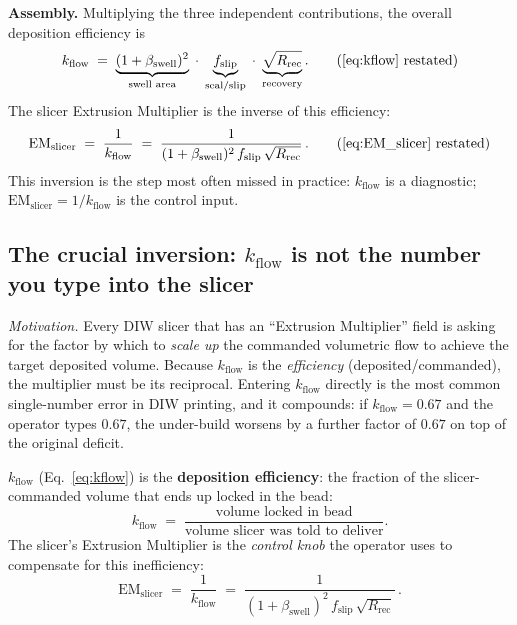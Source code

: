 \documentclass[11pt,a4paper]{article}
\begin{document}
\begin{derivationbox}[title={DERIVATION --- Each factor in $k_\mathrm{flow}=(1+\beta_\mathrm{swell})^2 f_\mathrm{slip}\sqrt{R_\mathrm{rec}}$}]
\medskip\noindent\textbf{Assembly.}
Multiplying the three independent contributions, the overall deposition
efficiency is
\begin{equation}
k_\mathrm{flow}
\;=\;
\underbrace{(1+\beta_\mathrm{swell})^{2}}_{\text{swell area}}
\;\cdot\;
\underbrace{f_\mathrm{slip}}_{\text{seal/slip}}
\;\cdot\;
\underbrace{\sqrt{R_\mathrm{rec}}}_{\text{recovery}}.
\tag{\ref{eq:kflow} restated}
\end{equation}
The slicer Extrusion Multiplier is the inverse of this efficiency:
\begin{equation}
\mathrm{EM}_\mathrm{slicer}
\;=\;
\frac{1}{k_\mathrm{flow}}
\;=\;
\frac{1}{(1+\beta_\mathrm{swell})^{2}\,f_\mathrm{slip}\,\sqrt{R_\mathrm{rec}}}\,.
\tag{\ref{eq:EM_slicer} restated}
\end{equation}
This inversion is the step most often missed in practice: $k_\mathrm{flow}$
is a diagnostic; $\mathrm{EM}_\mathrm{slicer}=1/k_\mathrm{flow}$ is
the control input.
\end{derivationbox}

\subsection{The crucial inversion: $k_\mathrm{flow}$ is not the number you type into the slicer}
\label{sec:kflow_inversion}

\emph{Motivation.}
Every DIW slicer that has an ``Extrusion Multiplier'' field is asking
for the factor by which to \emph{scale up} the commanded volumetric
flow to achieve the target deposited volume. Because $k_\mathrm{flow}$
is the \emph{efficiency} (deposited/commanded), the multiplier must be
its reciprocal. Entering $k_\mathrm{flow}$ directly is the most
common single-number error in DIW printing, and it compounds: if
$k_\mathrm{flow}=0.67$ and the operator types $0.67$, the under-build
worsens by a further factor of $0.67$ on top of the original deficit.

$k_\mathrm{flow}$ (Eq.~\ref{eq:kflow}) is the \textbf{deposition
efficiency}: the fraction of the slicer-commanded volume that ends up
locked in the bead:
\begin{equation}
k_\mathrm{flow}
\;=\;
\frac{\text{volume locked in bead}}
     {\text{volume slicer was told to deliver}}.
\label{eq:kflow_meaning}
\end{equation}
The slicer's Extrusion Multiplier is the \emph{control knob} the
operator uses to compensate for this inefficiency:
\begin{equation}
\boxed{\;\mathrm{EM}_\mathrm{slicer}
\;=\;
\frac{1}{k_\mathrm{flow}}
\;=\;
\frac{1}{(1+\beta_\mathrm{swell})^{2}\,f_\mathrm{slip}\,\sqrt{R_\mathrm{rec}}}\,.\;}
\label{eq:EM_slicer}
\end{equation}
\end{document}
